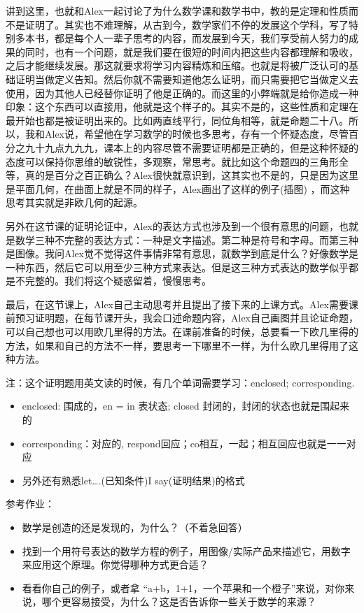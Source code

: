 \documentclass[
]{book}
\providecommand{\tightlist}{%
  \setlength{\itemsep}{0pt}\setlength{\parskip}{0pt}}
\begin{document}
讲到这里，也就和Alex一起讨论了为什么数学课和数学书中，教的是定理和性质而不是证明了。其实也不难理解，从古到今，数学家们不停的发展这个学科，写了特别多本书，都是每个人一辈子思考的内容，而发展到今天，我们享受前人努力的成果的同时，也有一个问题，就是我们要在很短的时间内把这些内容都理解和吸收，之后才能继续发展。那这就要求将学习内容精炼和压缩。也就是将被广泛认可的基础证明当做定义告知。然后你就不需要知道他怎么证明，而只需要把它当做定义去使用，因为其他人已经替你证明了他是正确的。而这里的小弊端就是给你造成一种印象：这个东西可以直接用，他就是这个样子的。其实不是的，这些性质和定理在最开始也都是被证明出来的。比如两直线平行，同位角相等，就是命题二十八。所以，我和Alex说，希望他在学习数学的时候也多思考，存有一个怀疑态度，尽管百分之九十九点九九九，课本上的内容尽管不需要证明都是正确的，但是这种怀疑的态度可以保持你思维的敏锐性，多观察，常思考。就比如这个命题四的三角形全等，真的是百分之百正确么？Alex很快就意识到，这其实也不是的，只是因为这里是平面几何，在曲面上就是不同的样子，Alex画出了这样的例子(插图) ，而这种思考其实就是非欧几何的起源。

另外在这节课的证明论证中，Alex的表达方式也涉及到一个很有意思的问题，也就是数学三种不完整的表达方式：一种是文字描述。第二种是符号和字母。而第三种是图像。我问Alex觉不觉得这件事情非常有意思，就数学到底是什么？好像数学是一种东西，然后它可以用至少三种方式来表达。但是这三种方式表达的数学似乎都是不完整的。我们将这个疑惑留着，慢慢思考。

最后，在这节课上，Alex自己主动思考并且提出了接下来的上课方式。Alex需要课前预习证明题，在每节课开头，我会口述命题内容，Alex自己画图并且论证命题，可以自己想也可以用欧几里得的方法。在课前准备的时候，总要看一下欧几里得的方法，如果和自己的方法不一样，要思考一下哪里不一样，为什么欧几里得用了这种方法。

注：这个证明题用英文读的时候，有几个单词需要学习：enclosed; corresponding.

\begin{itemize}
\tightlist
\item
  enclosed: 围成的，en = in 表状态; closed 封闭的，封闭的状态也就是围起来的
\item
  corresponding：对应的, respond回应；co相互，一起；相互回应也就是一一对应
\item
  另外还有熟悉let\ldots.(已知条件)I say(证明结果)的格式
\end{itemize}

参考作业：

\begin{itemize}
\tightlist
\item
  数学是创造的还是发现的，为什么？（不着急回答）
\item
  找到一个用符号表达的数学方程的例子，用图像/实际产品来描述它，用数字来应用这个原理。你觉得哪种方式更合适？
\item
  看看你自己的例子，或者拿 ``a+b，1+1，一个苹果和一个橙子''来说，对你来说，哪个更容易接受，为什么？这是否告诉你一些关于数学的来源？
\end{itemize}
\end{document}
